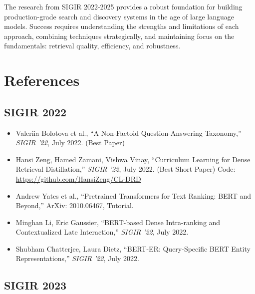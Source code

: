 \documentclass[11pt,letterpaper]{article}
\begin{document}
The research from SIGIR 2022-2025 provides a robust foundation for building production-grade search and discovery systems in the age of large language models. Success requires understanding the strengths and limitations of each approach, combining techniques strategically, and maintaining focus on the fundamentals: retrieval quality, efficiency, and robustness.

\newpage

\section{References}

\subsection{SIGIR 2022}

\begin{itemize}[leftmargin=*]
    \item Valeriia Bolotova et al., ``A Non-Factoid Question-Answering Taxonomy,'' \textit{SIGIR '22}, July 2022. (Best Paper)

    \item Hansi Zeng, Hamed Zamani, Vishwa Vinay, ``Curriculum Learning for Dense Retrieval Distillation,'' \textit{SIGIR '22}, July 2022. (Best Short Paper) Code: \url{https://github.com/HansiZeng/CL-DRD}

    \item Andrew Yates et al., ``Pretrained Transformers for Text Ranking: BERT and Beyond,'' ArXiv: 2010.06467, Tutorial.

    \item Minghan Li, Eric Gaussier, ``BERT-based Dense Intra-ranking and Contextualized Late Interaction,'' \textit{SIGIR '22}, July 2022.

    \item Shubham Chatterjee, Laura Dietz, ``BERT-ER: Query-Specific BERT Entity Representations,'' \textit{SIGIR '22}, July 2022.
\end{itemize}

\subsection{SIGIR 2023}
\end{document}
